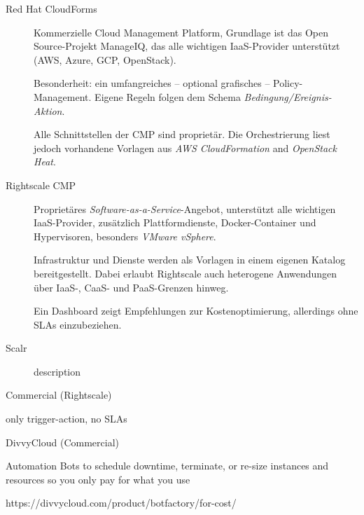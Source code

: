 \begin{description}
	
	\item[Red Hat CloudForms\footnotemark]
	Kommerzielle Cloud Management Platform, Grundlage ist das Open Source-Projekt  ManageIQ\footnotemark{}, das alle wichtigen IaaS-Provider unterstützt (AWS, Azure, GCP, OpenStack).	
	
	Besonderheit: ein umfangreiches -- optional grafisches -- Policy-Management. Eigene Regeln folgen dem Schema \emph{Bedingung/Ereignis-Aktion}.
	
	Alle Schnittstellen der CMP sind proprietär. Die Orchestrierung liest jedoch vorhandene Vorlagen aus \emph{AWS CloudFormation} and \emph{OpenStack Heat}.
	
	\item[Rightscale CMP\footnotemark]
	Proprietäres \emph{Software-as-a-Service}-Angebot, unterstützt alle wichtigen IaaS-Provider, zusätzlich Plattformdienste, Docker-Container und Hypervisoren, besonders \emph{VMware vSphere}.
	
	Infrastruktur und Dienste werden als Vorlagen in einem eigenen Katalog bereitgestellt. Dabei erlaubt Rightscale auch heterogene Anwendungen über IaaS-, CaaS- und PaaS-Grenzen hinweg.
	
	Ein Dashboard zeigt Empfehlungen zur Kostenoptimierung, allerdings ohne SLAs einzubeziehen.
	
	\item[Scalr] description

\end{description}



Commercial (Rightscale) 

only trigger-action, no SLAs 



DivvyCloud (Commercial) 

Automation Bots to schedule downtime, terminate, or re-size instances and resources so you only pay for what you use 

https://divvycloud.com/product/botfactory/for-cost/ 

